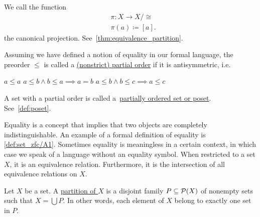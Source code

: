 \begin{definition}
\begin{defenum}
    We call the function
    \begin{align*}
      &\pi: X \to X / \cong \\
      &\pi(a) \coloneqq [a].
    \end{align*}
    the canonical projection. See~\cref{thm:equivalence_partition}.

    \item\label{def:order/partial} Assuming we have defined a notion of equality in our formal language, the preorder $\leq$ is called a \uline{(nonstrict) partial order} if it is antisymmetric, i.e.
    \begin{description}
       $a \leq a$
       $a \leq b \land b \leq a \implies a = b$
       $a \leq b \land b \leq c \implies a \leq c$
    \end{description}

    A set with a partial order is called a~\uline{partially ordered set or poset}. See~\cref{def:poset}.
  \end{defenum}
\end{definition}

\begin{note}\label{note:equality_equivalence_relation}
  Equality is a concept that implies that two objects are completely indistinguishable. An example of a formal definition of equality is \cref{def:set_zfc/A1}. Sometimes equality is meaningless in a certain context, in which case we speak of a language without an equality symbol. When restricted to a set $X$, it is an equivalence relation. Furthermore, it is the intersection of all equivalence relations on $X$.
\end{note}

\begin{definition}\label{def:set_partition}
  Let $X$ be a set. A \uline{partition of $X$} is a disjoint family $P \subseteq \operatorname{\mathcal P}(X)$ of nonempty sets such that $X = \bigcup P$. In other words, each element of $X$ belong to exactly one set in $P$.
\end{definition}

